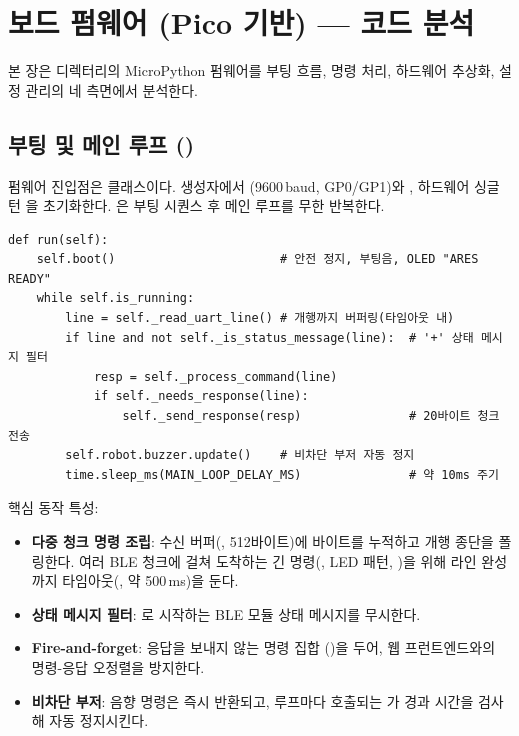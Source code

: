 \section{보드 펌웨어 (Pico 기반) --- 코드 분석}

본 장은  디렉터리의 MicroPython 펌웨어를 부팅 흐름, 명령 처리,
하드웨어 추상화, 설정 관리의 네 측면에서 분석한다.

\subsection{부팅 및 메인 루프 ()}

펌웨어 진입점은  클래스이다. 생성자에서 
(9600\,baud, GP0/GP1)와 , 하드웨어 싱글턴 을
초기화한다. 은 부팅 시퀀스 후 메인 루프를 무한 반복한다.

\begin{verbatim}
def run(self):
    self.boot()                       # 안전 정지, 부팅음, OLED "ARES READY"
    while self.is_running:
        line = self._read_uart_line() # 개행까지 버퍼링(타임아웃 내)
        if line and not self._is_status_message(line):  # '+' 상태 메시지 필터
            resp = self._process_command(line)
            if self._needs_response(line):
                self._send_response(resp)               # 20바이트 청크 전송
        self.robot.buzzer.update()    # 비차단 부저 자동 정지
        time.sleep_ms(MAIN_LOOP_DELAY_MS)               # 약 10ms 주기
\end{verbatim}

핵심 동작 특성:

\begin{itemize}
  \item \textbf{다중 청크 명령 조립}: 수신 버퍼(, 512바이트)에
        바이트를 누적하고 개행 종단을 폴링한다. 여러 BLE 청크에 걸쳐 도착하는
        긴 명령(, LED 패턴, )을 위해 라인 완성까지
        타임아웃(, 약 500\,ms)을 둔다.
  \item \textbf{상태 메시지 필터}: \code{+}로 시작하는 BLE 모듈 상태 메시지를 무시한다.
  \item \textbf{Fire-and-forget}: 응답을 보내지 않는 명령 집합
        ()을 두어, 웹 프런트엔드와의 명령-응답
        오정렬을 방지한다.
  \item \textbf{비차단 부저}: 음향 명령은 즉시 반환되고, 루프마다 호출되는
        가 경과 시간을 검사해 자동 정지시킨다.
\end{itemize}

